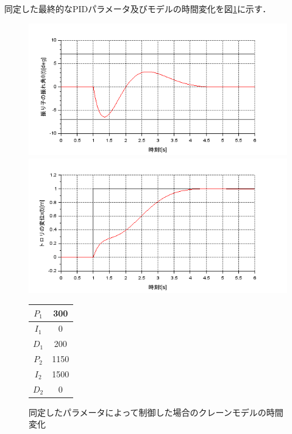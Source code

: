 \documentclass[dvipdfmx,titlepage,a4j]{jsarticle}  %
\begin{document}
同定した最終的なPIDパラメータ及びモデルの時間変化を図\ref{fig:crane:fin-up}に示す．

\begin{figure}[H]
  \begin{minipage}{4.5cm}
    \centering
    \includegraphics[keepaspectratio, scale=0.35]{../graph/crane/ang-fin-up.png}
  \end{minipage}
  \hfill
  \begin{minipage}{4.5cm}
    \centering
    \includegraphics[keepaspectratio, scale=0.35]{../graph/crane/po-fin-up.png}
  \end{minipage}
  \hfill
  \begin{minipage}{3cm}
    \begin{center}
      \begin{tabular}{c|c}
        \hline
        $P_1$ & 300  \\ \hline
        $I_1$ & 0    \\ \hline
        $D_1$ & 200  \\ \hline
        $P_2$ & 1150 \\ \hline
        $I_2$ & 1500 \\ \hline
        $D_2$ & 0    \\
        \hline
      \end{tabular}
    \end{center}
  \end{minipage}
  \hfill
  \caption{同定したパラメータによって制御した場合のクレーンモデルの時間変化}
  \label{fig:crane:fin-up}
\end{figure}
\end{document}
